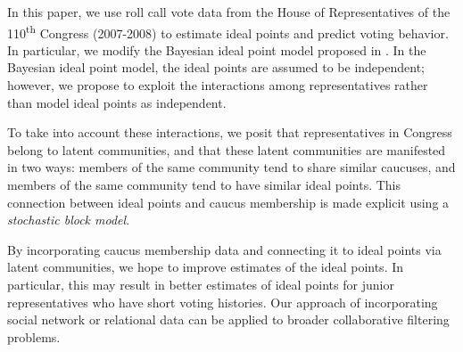 \documentclass{article}
\begin{document}
In this paper, we use roll call vote data from the House of Representatives of the 110\textsuperscript{th} Congress (2007-2008) to estimate ideal points and predict voting behavior. In particular, we modify the Bayesian ideal point model proposed in \cite{Clinton2004}. In the Bayesian ideal point model, the ideal points are assumed to be independent; however, we propose to exploit the interactions among representatives rather than model ideal points as independent. \par

To take into account these interactions, we posit that representatives in Congress belong to latent communities, and that these latent communities are manifested in two ways: members of the same community tend to share similar caucuses, and members of the same community tend to have similar ideal points. This connection between ideal points and caucus membership is made explicit using a {\itshape stochastic block model}. \par

By incorporating caucus membership data and connecting it to ideal points via latent communities, we hope to improve estimates of the ideal points. In particular, this  may result in better estimates of ideal points for junior representatives who have short voting histories. Our approach of incorporating social network or relational data can be applied to broader collaborative filtering problems.
\end{document}
